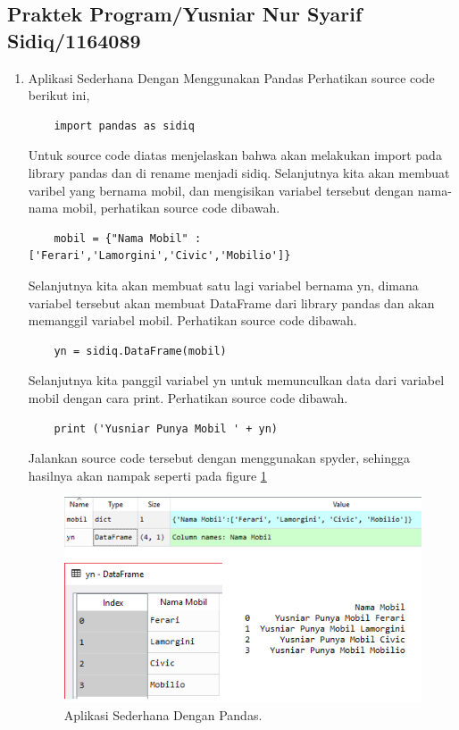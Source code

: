 \subsection{Praktek Program/Yusniar Nur Syarif Sidiq/1164089}
\begin{enumerate}
\item Aplikasi Sederhana Dengan Menggunakan Pandas
\subitem Perhatikan source code berikut ini,
	\begin{verbatim}
	import pandas as sidiq
	\end{verbatim}
Untuk source code diatas menjelaskan bahwa akan melakukan import pada library pandas dan di rename menjadi sidiq. Selanjutnya kita akan membuat varibel yang bernama mobil, dan mengisikan variabel tersebut dengan nama-nama mobil, perhatikan source code dibawah.
	\begin{verbatim}
	mobil = {"Nama Mobil" : ['Ferari','Lamorgini','Civic','Mobilio']}
	\end{verbatim}
Selanjutnya kita akan membuat satu lagi variabel bernama yn, dimana variabel tersebut akan membuat DataFrame dari library pandas dan akan memanggil variabel mobil. Perhatikan source code dibawah.
	\begin{verbatim}
	yn = sidiq.DataFrame(mobil)
	\end{verbatim}
Selanjutnya kita panggil variabel yn untuk memunculkan data dari variabel mobil dengan cara print. Perhatikan source code dibawah.
	\begin{verbatim}
	print ('Yusniar Punya Mobil ' + yn)
	\end{verbatim}
Jalankan source code tersebut dengan menggunakan spyder, sehingga hasilnya akan nampak seperti pada figure \ref{YNP}

	\begin{figure}[ht]
	\centerline{\includegraphics[width=1\textwidth]{figures/YN/Chapter3/YNPandas.png}}
	\caption{Aplikasi Sederhana Dengan Pandas.}
	\label{YNP}
	\end{figure}


\end{enumerate}
